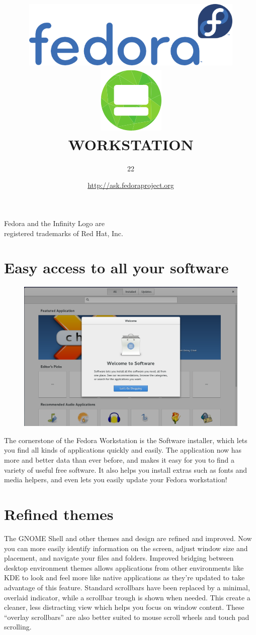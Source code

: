 \documentclass[
letterpaper,
10pt
]{leaflet}
\title{\includegraphics[keepaspectratio,width=0.8\textwidth]{Logo_fedoralogo.png}\vspace{1cm}\\\includegraphics[keepaspectratio,scale=0.5]{workstation_logo_only.png}\\\vspace{0.5cm}\LARGE{\textcolor{ResolutionBlue}{WORKSTATION}}}
\author{\LARGE{\textcolor{ResolutionBlue}{22}}}
\date{\href{http://ask.fedoraproject.org}{http://ask.fedoraproject.org}}
\begin{document}
\maketitle
\thispagestyle{empty}
\vspace{5cm}
\begin{center}\small{Fedora and the Infinity Logo are\\registered trademarks of Red Hat, Inc.}\end{center}

\newpage


\section{\textcolor{FedoraBlue}{Easy access to all your software}}
\begin{figure}[h]
  \includegraphics[keepaspectratio,width=\textwidth]{Gnome_software_welcome-cropped.png}
\end{figure}
The cornerstone of the Fedora Workstation is the Software installer, which lets you find all kinds of applications quickly and easily. The application now has more and better data than ever before, and makes it easy for you to find a variety of useful free software. It also helps you install extras such as fonts and media helpers, and even lets you easily update your Fedora workstation!

\section{\textcolor{FedoraBlue}{Refined themes}}
The GNOME Shell and other themes and design are refined and improved. Now you can more easily identify information on the screen, adjust window size and placement, and navigate your files and folders. Improved bridging between desktop environment themes allows applications from other environments like KDE to look and feel more like native applications as they're updated to take advantage of this feature. Standard scrollbars have been replaced by a minimal, overlaid indicator, while a scrollbar trough is shown when needed. This create a cleaner, less distracting view which helps you focus on window content. These ``overlay scrollbars'' are also better suited to mouse scroll wheels and touch pad scrolling.
\end{document}
